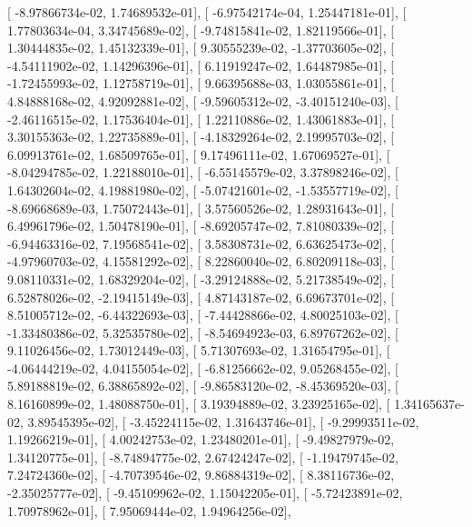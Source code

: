 \documentclass{article}
\begin{document}
       [ -8.97866734e-02,   1.74689532e-01],
       [ -6.97542174e-04,   1.25447181e-01],
       [  1.77803634e-04,   3.34745689e-02],
       [ -9.74815841e-02,   1.82119566e-01],
       [  1.30444835e-02,   1.45132339e-01],
       [  9.30555239e-02,  -1.37703605e-02],
       [ -4.54111902e-02,   1.14296396e-01],
       [  6.11919247e-02,   1.64487985e-01],
       [ -1.72455993e-02,   1.12758719e-01],
       [  9.66395688e-03,   1.03055861e-01],
       [  4.84888168e-02,   4.92092881e-02],
       [ -9.59605312e-02,  -3.40151240e-03],
       [ -2.46116515e-02,   1.17536404e-01],
       [  1.22110886e-02,   1.43061883e-01],
       [  3.30155363e-02,   1.22735889e-01],
       [ -4.18329264e-02,   2.19995703e-02],
       [  6.09913761e-02,   1.68509765e-01],
       [  9.17496111e-02,   1.67069527e-01],
       [ -8.04294785e-02,   1.22188010e-01],
       [ -6.55145579e-02,   3.37898246e-02],
       [  1.64302604e-02,   4.19881980e-02],
       [ -5.07421601e-02,  -1.53557719e-02],
       [ -8.69668689e-03,   1.75072443e-01],
       [  3.57560526e-02,   1.28931643e-01],
       [  6.49961796e-02,   1.50478190e-01],
       [ -8.69205747e-02,   7.81080339e-02],
       [ -6.94463316e-02,   7.19568541e-02],
       [  3.58308731e-02,   6.63625473e-02],
       [ -4.97960703e-02,   4.15581292e-02],
       [  8.22860040e-02,   6.80209118e-03],
       [  9.08110331e-02,   1.68329204e-02],
       [ -3.29124888e-02,   5.21738549e-02],
       [  6.52878026e-02,  -2.19415149e-03],
       [  4.87143187e-02,   6.69673701e-02],
       [  8.51005712e-02,  -6.44322693e-03],
       [ -7.44428866e-02,   4.80025103e-02],
       [ -1.33480386e-02,   5.32535780e-02],
       [ -8.54694923e-03,   6.89767262e-02],
       [  9.11026456e-02,   1.73012449e-03],
       [  5.71307693e-02,   1.31654795e-01],
       [ -4.06444219e-02,   4.04155054e-02],
       [ -6.81256662e-02,   9.05268455e-02],
       [  5.89188819e-02,   6.38865892e-02],
       [ -9.86583120e-02,  -8.45369520e-03],
       [  8.16160899e-02,   1.48088750e-01],
       [  3.19394889e-02,   3.23925165e-02],
       [  1.34165637e-02,   3.89545395e-02],
       [ -3.45224115e-02,   1.31643746e-01],
       [ -9.29993511e-02,   1.19266219e-01],
       [  4.00242753e-02,   1.23480201e-01],
       [ -9.49827979e-02,   1.34120775e-01],
       [ -8.74894775e-02,   2.67424247e-02],
       [ -1.19479745e-02,   7.24724360e-02],
       [ -4.70739546e-02,   9.86884319e-02],
       [  8.38116736e-02,  -2.35025777e-02],
       [ -9.45109962e-02,   1.15042205e-01],
       [ -5.72423891e-02,   1.70978962e-01],
       [  7.95069444e-02,   1.94964256e-02],
\end{document}
